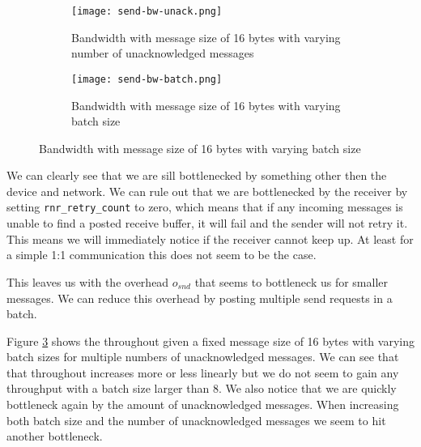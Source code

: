 \begin{figure}[h]
\begin{subfigure}[b]{0.49\textwidth}
  \centering
  \texttt{[image: send-bw-unack.png]}
  \caption{Bandwidth with message size of 16 bytes with varying number of unacknowledged messages}
  \label{fig:plot-sndrcv-bw-unack}
\end{subfigure}
\begin{subfigure}[b]{0.49\textwidth}
  \centering
  \texttt{[image: send-bw-batch.png]}
  \caption{Bandwidth with message size of 16 bytes with varying batch size }
  \label{fig:plot-sndrcv-bw-batch}
\end{subfigure}
\end{figure}



We can clearly see that we are sill bottlenecked by something other then the device and network. We can rule out that we are
bottlenecked by the receiver by setting \texttt{rnr\_retry\_count} to zero, which means that if any incoming messages is unable
to find a posted receive buffer, it will fail and the sender will not retry it. This means we will immediately notice if 
the receiver cannot keep up. At least for a simple 1:1 communication this does not seem to be the case.

This leaves us with the overhead $o_{snd}$ that seems to bottleneck us for smaller messages. We can reduce this overhead by 
posting multiple send requests in a batch. 

Figure \ref{fig:plot-sndrcv-bw-batch} shows the throughout given a fixed message size of 16 bytes with varying batch sizes for
multiple numbers of unacknowledged messages. We can see that that throughout increases more or less linearly but we do not seem
to gain any throughput with a batch size larger than 8. We also notice that we are quickly bottleneck again by the amount of 
unacknowledged messages. When increasing both batch size and the number of unacknowledged messages we seem to hit
another bottleneck.

